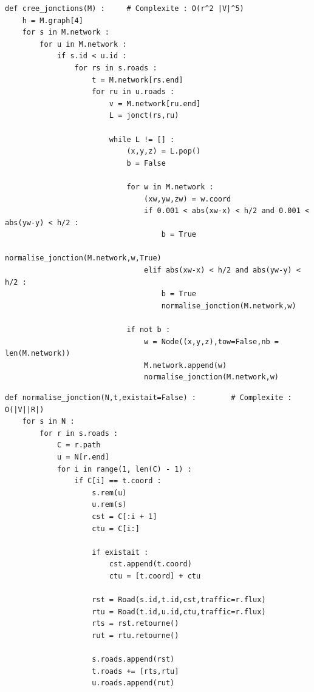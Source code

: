 \documentclass{beamer}[11pt]
\begin{document}
		\begin{frame}[containsverbatim]
\begin{lstlisting}
def cree_jonctions(M) : 	# Complexite : O(r^2 |V|^5)
    h = M.graph[4]
    for s in M.network :
        for u in M.network :
            if s.id < u.id :
                for rs in s.roads :
                    t = M.network[rs.end]
                    for ru in u.roads :
                        v = M.network[ru.end]
                        L = jonct(rs,ru)

                        while L != [] :
                            (x,y,z) = L.pop()
                            b = False

                            for w in M.network :
                                (xw,yw,zw) = w.coord
                                if 0.001 < abs(xw-x) < h/2 and 0.001 < abs(yw-y) < h/2 :
                                    b = True
                                    normalise_jonction(M.network,w,True)
                                elif abs(xw-x) < h/2 and abs(yw-y) < h/2 :
                                    b = True
                                    normalise_jonction(M.network,w)

                            if not b :
                                w = Node((x,y,z),tow=False,nb = len(M.network))
                                M.network.append(w)
                                normalise_jonction(M.network,w)
\end{lstlisting}
		\end{frame}

		\begin{frame}[containsverbatim]
\begin{lstlisting}
def normalise_jonction(N,t,existait=False) : 		# Complexite : O(|V||R|)
    for s in N :
        for r in s.roads :
            C = r.path
            u = N[r.end]
            for i in range(1, len(C) - 1) :
                if C[i] == t.coord :
                    s.rem(u)
                    u.rem(s)
                    cst = C[:i + 1]
                    ctu = C[i:]

                    if existait :
                        cst.append(t.coord)
                        ctu = [t.coord] + ctu

                    rst = Road(s.id,t.id,cst,traffic=r.flux)
                    rtu = Road(t.id,u.id,ctu,traffic=r.flux)
                    rts = rst.retourne()
                    rut = rtu.retourne()

                    s.roads.append(rst)
                    t.roads += [rts,rtu]
                    u.roads.append(rut)
\end{lstlisting}
		\end{frame}
\end{document}
